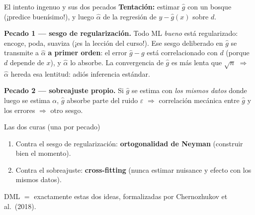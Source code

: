 \documentclass{beamer}
\newcommand{\1}{\mathbb{I}}
\begin{document}
\begin{frame}{El intento ingenuo y sus dos pecados}
\small
\textbf{Tentación:} estimar $\hat{g}$ con un bosque (¡predice buenísimo!), y luego $\hat{\alpha}$ de la regresión de $y - \hat{g}(x)$ sobre $d$.
\pause

\vspace{0.2cm}
\textbf{Pecado 1 --- sesgo de regularización.} Todo ML \emph{bueno} está regularizado: encoge, poda, suaviza (¡es la lección del curso!). Ese sesgo deliberado en $\hat{g}$ se transmite a $\hat{\alpha}$ \textbf{a primer orden}: el error $\hat{g} - g$ está correlacionado con $d$ (porque $d$ depende de $x$), y $\hat{\alpha}$ lo absorbe. La convergencia de $\hat{g}$ es más lenta que $\sqrt{n}$ $\Rightarrow$ $\hat{\alpha}$ hereda esa lentitud: adiós inferencia estándar.
\pause

\vspace{0.15cm}
\textbf{Pecado 2 --- sobreajuste propio.} Si $\hat{g}$ se estima con \emph{los mismos datos} donde luego se estima $\alpha$, $\hat{g}$ absorbe parte del ruido $\varepsilon$ $\Rightarrow$ correlación mecánica entre $\hat{g}$ y los errores $\Rightarrow$ otro sesgo.
\pause

\vspace{0.15cm}
\begin{block}{Las dos curas (una por pecado)}
\begin{enumerate}\itemsep2pt
  \item Contra el sesgo de regularización: \textbf{ortogonalidad de Neyman} (construir bien el momento).
  \item Contra el sobreajuste: \textbf{cross-fitting} (nunca estimar nuisance y efecto con los mismos datos).
\end{enumerate}
DML $=$ exactamente estas dos ideas, formalizadas por Chernozhukov et al.\ (2018).
\end{block}
\end{frame}
\end{document}
